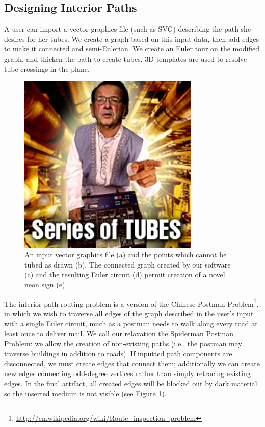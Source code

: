 \subsection{Designing Interior Paths}

A user can import a vector graphics file (such as SVG) describing the path she desires for her tubes.  We create a graph based on this input data, then add edges to make it connected and semi-Eulerian.  We create an Euler tour on the modified graph, and thicken the path to create tubes.  3D templates are used to resolve tube crossings in the plane.

\begin{figure}[h!]
\centering
    \includegraphics[width=3.4in]{figures/series-of-tubes.jpg}
\caption{An input vector graphics file (a) and the points which cannot be tubed as drawn (b).  The connected graph created by our software (c) and the resulting Euler circuit (d) permit creation of a novel neon sign (e).}
\label{fig:tool-process-interior}
\end{figure}

The interior path routing problem is a version of the Chinese Postman Problem\footnote{\url{http://en.wikipedia.org/wiki/Route_inspection_problem}}, in which we wish to traverse all edges of the graph described in the user's input with a single Euler circuit, much as a postman needs to walk along every road at least once to deliver mail.  We call our relaxation the Spiderman Postman Problem: we allow the creation of non-existing paths (i.e., the postman may traverse buildings in addition to roads).  If inputted path components are disconnected, we must create edges that connect them; additionally we can create new edges connecting odd-degree vertices rather than simply retracing existing edges.  In the final artifact, all created edges will be blocked out by dark material so the inserted medium is not visible (see Figure \ref{fig:tool-process-interior}).

